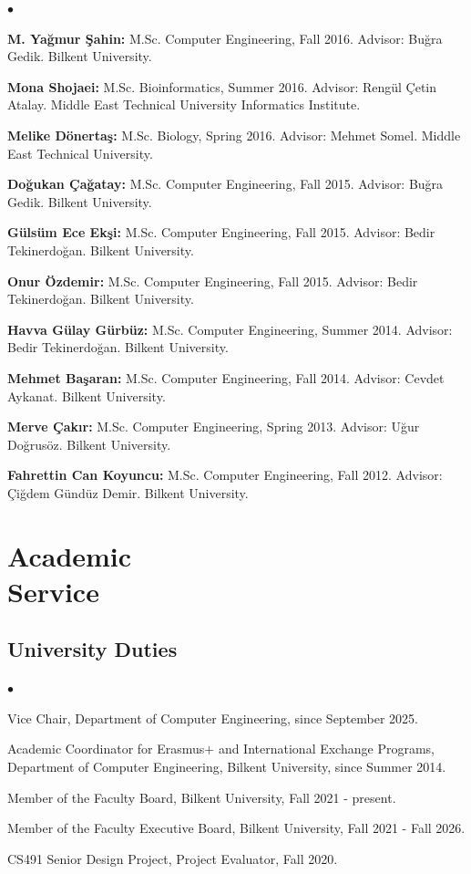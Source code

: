 \documentclass[margin,line]{res}
\newenvironment{list2}{
  \begin{list}{$\bullet$}{%
      \setlength{\itemsep}{0.1cm}
      \setlength{\parsep}{0in} \setlength{\parskip}{0in}
      \setlength{\topsep}{0in} \setlength{\partopsep}{0in} 
      \setlength{\leftmargin}{0.2in}}}{\end{list}}
\begin{document}
\begin{resume}
\begin{list2}
\item
  {\bf M. Yağmur Şahin:} M.Sc. Computer Engineering, Fall 2016. Advisor: Buğra Gedik.
  Bilkent University. 
\item
  {\bf Mona Shojaei:} M.Sc. Bioinformatics,  Summer 2016. Advisor: Rengül Çetin Atalay.
  Middle East Technical University Informatics Institute.

\item
  {\bf Melike Dönertaş:} M.Sc. Biology, Spring 2016. Advisor: Mehmet Somel.
  Middle East Technical University. 
\item
  {\bf Doğukan Çağatay:} M.Sc. Computer Engineering,  Fall 2015. Advisor: Buğra Gedik.
  Bilkent University. 
\item
  {\bf Gülsüm Ece Ekşi:} M.Sc. Computer Engineering,  Fall 2015. Advisor: Bedir Tekinerdoğan.
Bilkent University. 
\item
  {\bf Onur Özdemir:} M.Sc. Computer Engineering,  Fall 2015. Advisor: Bedir Tekinerdoğan.
  Bilkent University. 
\item
  {\bf Havva Gülay Gürbüz:} M.Sc. Computer Engineering, Summer 2014. Advisor: Bedir Tekinerdoğan.
  Bilkent University. 
 \item
  {\bf Mehmet Başaran:} M.Sc. Computer Engineering, Fall 2014. Advisor: Cevdet Aykanat.
  Bilkent University. 
\item
  {\bf Merve Çakır:} M.Sc. Computer Engineering, Spring 2013. Advisor: Uğur Doğrusöz.
  Bilkent University.
\item
  {\bf Fahrettin Can Koyuncu:} M.Sc. Computer Engineering, Fall 2012. Advisor: Çiğdem Gündüz Demir.
  Bilkent University. 
  \end{list2}


\vspace*{-.2cm}
\section{\sc Academic \\ Service}
\vspace{-0.3cm}
\subsection{\small \sc University Duties}
\begin{list2}
\item   
    Vice Chair, Department of Computer Engineering, since September 2025.
\item
  Academic Coordinator for Erasmus+ and International Exchange Programs, Department of Computer Engineering, Bilkent University, since Summer 2014.
\item 
 Member of the Faculty Board, Bilkent University,  Fall 2021 - present.
\item 
 Member of the Faculty Executive Board, Bilkent University,  Fall 2021 - Fall 2026.
\item CS491 Senior Design Project, Project Evaluator, Fall 2020.
\end{list2}
\vspace{-0.4cm}



\end{resume}
\end{document}
